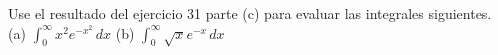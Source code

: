 \item Use el resultado del ejercicio 31 parte (c) para evaluar las integrales siguientes. \\
(a) $\int_0^\infty x^2 e^{-x^2} \, dx$ \qquad \qquad (b) $\int_0^\infty \sqrt{x} e^{-x} \, dx$
